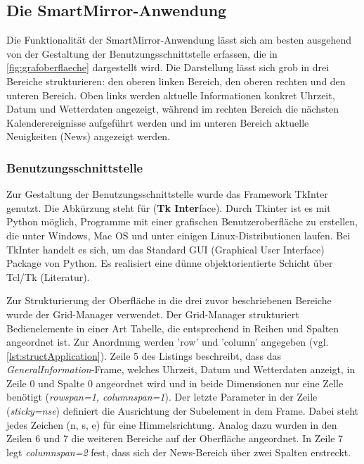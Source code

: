 \subsection{Die SmartMirror-Anwendung}

Die Funktionalität der SmartMirror-Anwendung lässt sich am besten ausgehend von der Gestaltung der Benutzungsschnittstelle erfassen, die in \autoref{fig:grafoberflaeche} dargestellt wird. Die Darstellung lässt sich grob in drei Bereiche strukturieren: den oberen linken Bereich, den oberen rechten und den unteren Bereich. Oben links werden aktuelle Informationen konkret Uhrzeit, Datum und Wetterdaten angezeigt, während im rechten Bereich die nächsten Kalenderereignisse aufgeführt werden und im unteren Bereich aktuelle Neuigkeiten (News) angezeigt werden. 

\subsubsection*{Benutzungsschnittstelle}

Zur Gestaltung der Benutzungsschnittstelle wurde das Framework TkInter genutzt. Die Abkürzung steht für (\textbf{Tk Inter}face).  Durch Tkinter ist es mit Python möglich, Programme mit einer grafischen Benutzeroberfläche zu erstellen, die unter Windows, Mac OS und unter einigen Linux-Distributionen laufen. Bei TkInter handelt es sich, um das Standard GUI (Graphical User Interface) Package von Python. Es realisiert eine dünne objektorientierte Schicht über Tcl/Tk (Literatur). 

Zur Strukturierung der Oberfläche in die drei zuvor beschriebenen Bereiche wurde der Grid-Manager verwendet. Der Grid-Manager strukturiert Bedienelemente in einer Art Tabelle, die entsprechend in Reihen und Spalten angeordnet ist. Zur Anordnung werden 'row' und 'column' angegeben (vgl. \autoref{lst:structApplication}). Zeile 5 des Listings beschreibt, dass das \textit{GeneralInformation}-Frame, welches Uhrzeit, Datum und Wetterdaten anzeigt, in Zeile 0 und Spalte 0 angeordnet wird und in beide Dimensionen nur eine Zelle benötigt (\textit{rowspan=1, columnspan=1}). Der letzte Parameter in der Zeile (\textit{sticky=\grqq nse\grqq}) definiert die Ausrichtung der Subelement in dem Frame. Dabei steht jedes Zeichen (n, s, e) für eine Himmelsrichtung. Analog dazu wurden in den Zeilen 6 und 7 die weiteren Bereiche auf der Oberfläche angeordnet. In Zeile 7 legt \textit{\textit{columnspan=2}} fest, dass sich der News-Bereich über zwei Spalten erstreckt.


